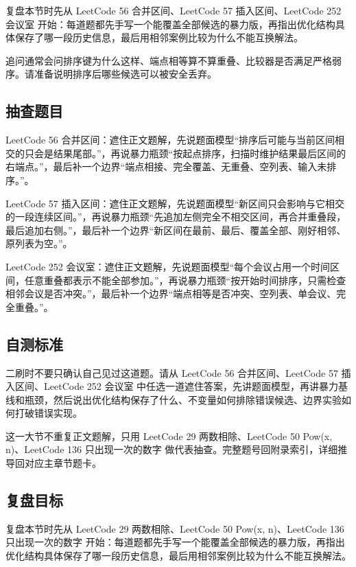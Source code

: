 复盘本节时先从 LeetCode 56 合并区间、LeetCode 57 插入区间、LeetCode 252 会议室 开始：每道题都先手写一个能覆盖全部候选的暴力版，再指出优化结构具体保存了哪一段历史信息，最后用相邻案例比较为什么不能互换解法。

追问通常会问排序键为什么这样、端点相等算不算重叠、比较器是否满足严格弱序。请准备说明排序后哪些候选可以被安全丢弃。

\subsection{抽查题目}

LeetCode 56 合并区间：遮住正文题解，先说题面模型“排序后可能与当前区间相交的只会是结果尾部。”，再说暴力瓶颈“按起点排序，扫描时维护结果最后区间的右端点。”，最后补一个边界“端点相接、完全覆盖、无重叠、空列表、输入未排序。”。

LeetCode 57 插入区间：遮住正文题解，先说题面模型“新区间只会影响与它相交的一段连续区间。”，再说暴力瓶颈“先追加左侧完全不相交区间，再合并重叠段，最后追加右侧。”，最后补一个边界“新区间在最前、最后、覆盖全部、刚好相邻、原列表为空。”。

LeetCode 252 会议室：遮住正文题解，先说题面模型“每个会议占用一个时间区间，任意重叠都表示不能全部参加。”，再说暴力瓶颈“按开始时间排序，只需检查相邻会议是否冲突。”，最后补一个边界“端点相等是否冲突、空列表、单会议、完全重叠。”。

\subsection{自测标准}

二刷时不要只确认自己见过这道题。请从 LeetCode 56 合并区间、LeetCode 57 插入区间、LeetCode 252 会议室 中任选一道遮住答案，先讲题面模型，再讲暴力基线和瓶颈，然后说出优化结构保存了什么、不变量如何排除错误候选、边界实验如何打破错误实现。

这一大节不重复正文题解，只用 LeetCode 29 两数相除、LeetCode 50 Pow(x, n)、LeetCode 136 只出现一次的数字 做代表抽查。完整题号回附录索引，详细推导回对应主章节题卡。

\subsection{复盘目标}

复盘本节时先从 LeetCode 29 两数相除、LeetCode 50 Pow(x, n)、LeetCode 136 只出现一次的数字 开始：每道题都先手写一个能覆盖全部候选的暴力版，再指出优化结构具体保存了哪一段历史信息，最后用相邻案例比较为什么不能互换解法。


